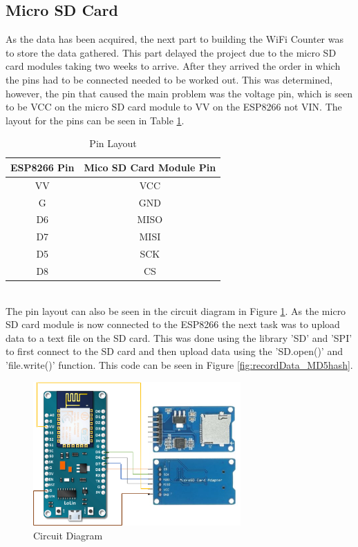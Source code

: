 \documentclass{report}
\begin{document}
\subsection{Micro SD Card}
As the data has been acquired, the next part to building the WiFi Counter was to store the data gathered. This part delayed the project due to the micro SD card modules taking two weeks to arrive. After they arrived the order in which the pins had to be connected needed to be worked out. This was determined, however, the pin that caused the main problem was the voltage pin, which is seen to be VCC on the micro SD card module to VV on the ESP8266 not VIN. The layout for the pins can be seen in Table \ref{tab:pin_layout}.  \\ \newline
\begin{table}[h!]
    \centering
    \begin{tabular}{c c}
    \hline
     ESP8266 Pin & Mico SD Card Module Pin\\
     \hline
     VV & VCC \\
     G & GND \\
     D6 & MISO \\
     D7 & MISI \\
     D5 & SCK \\
     D8 & CS \\
     \hline
    \end{tabular}
     \caption{Pin Layout}
     \label{tab:pin_layout}
\end{table} \\ \newline
The pin layout can also be seen in the circuit diagram in Figure \ref{fig:circuitDiagram}. As the micro SD card module is now connected to the ESP8266 the next task was to upload data to a text file on the SD card. This was done using the library 'SD'\cite{SD} and 'SPI'\cite{SPI} to first connect to the SD card and then upload data using the 'SD.open()' and 'file.write()' function. This code can be seen in Figure \ref{fig:recordData_MD5hash}. \\ \newline
\begin{figure}[h!]
    \centering
    \includegraphics[width=300]{circuit_diagram.png} 
    \caption{Circuit Diagram}
    \label{fig:circuitDiagram}
\end{figure} \\
\end{document}
